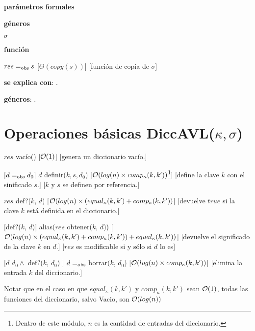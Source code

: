\begin{Interfaz}
  \textbf{parámetros formales}\parindent\\
  \parbox{1.7cm}{\textbf{géneros}} $\sigma$\\
  \parbox[t]{1.7cm}{\textbf{función}}\parbox[t]{\textwidth-2\parindent-1.7cm}{    	
    {$res =_{\mathrm{obs}} s$}
    [$\Theta(copy(s))$]
    [función de copia de $\sigma$]
    }
      
  \textbf{se explica con}: .

  \textbf{géneros}: .

  \section*{Operaciones básicas DiccAVL($\kappa, \sigma$)}

  {$res$ \igobs vacío()}
  [$\mathcal{O}(1)$]
  [genera un diccionario vacío.]

  [$d =_{\mathrm{obs}} d_0$]  
  {$d$ \igobs definir($k, s, d_0$)}
  [$\mathcal{O}(log(n) \times comp_{\kappa}(k, k'))$\footnote{Dentro de este módulo, $n$ es la cantidad de entradas del diccionario.}]
  [define la clave $k$ con el sinificado $s$.]
  [$k$ y $s$ se definen por referencia.]
    
  {$res$ \igobs def?($k$, $d$) }
  [$\mathcal{O}(log(n) \times (equal_{\kappa}(k, k') + comp_{\kappa}(k, k'))$]
  [devuelve $true$ si la clave $k$ está definida en el diccionario.]
  
  [def?($k$, $d$)]  
  {alias($res$ \igobs obtener($k$, $d$))}
  [$\mathcal{O}(log(n) \times (equal_{\kappa}(k, k') + comp_{\kappa}(k, k')) + equal_{\kappa}(k, k'))$]
  [devuelve el significado de la clave $k$ en $d$.]
  [$res$ es modificable si y sólo si $d$ lo es]
  
  [$d$ \igobs $d_0 \land$ def?($k$, $d_0$) ]
  {$d =_{\mathrm{obs}}$ borrar($k$, $d_0$)}
  [$\mathcal{O}(log(n) \times comp_{\kappa}(k, k'))$]
  [elimina la entrada $k$ del diccionario.] 
  
  Notar que en el caso en que $equal_{\kappa}(k, k')$ y $comp_{\kappa}(k, k')$ sean $\mathcal{O}(1)$, todas las funciones del diccionario, salvo Vacio, son $\mathcal{O}(log(n))$
  \clearpage
\end{Interfaz}

